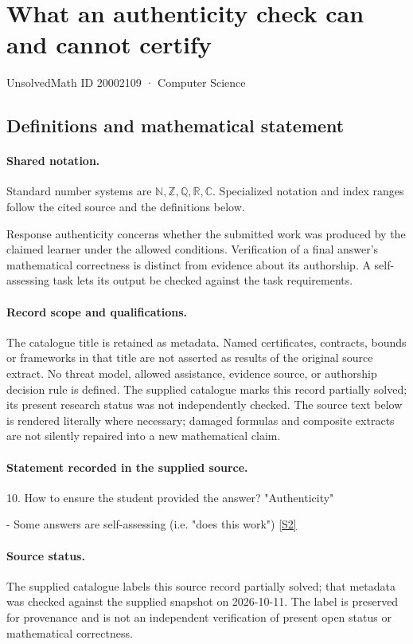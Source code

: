 \documentclass[11pt]{article}
\newcommand{\sref}[2]{\hyperlink{source:#1:#2}{[S#2]}}
\begin{document}
\setcounter{section}{20002108}
\section{What an authenticity check can and cannot certify}\label{20002109}
{\small\sffamily UnsolvedMath ID 20002109 · Computer Science}
\subsection{Definitions and mathematical statement}

\paragraph{Shared notation.}Standard number systems are $\mathbb N,\mathbb Z,\mathbb Q,\mathbb R,\mathbb C$. Specialized notation and index ranges follow the cited source and the definitions below.


Response authenticity concerns whether the submitted work was produced by the claimed learner under the allowed conditions. Verification of a final answer's mathematical correctness is distinct from evidence about its authorship. A self-assessing task lets its output be checked against the task requirements.
\paragraph{Record scope and qualifications.}
The catalogue title is retained as metadata. Named certificates, contracts, bounds or frameworks in that title are not asserted as results of the original source extract.
No threat model, allowed assistance, evidence source, or authorship decision rule is defined. The supplied catalogue marks this record partially solved; its present research status was not independently checked.
The source text below is rendered literally where necessary; damaged formulas and composite extracts are not silently repaired into a new mathematical claim.
\paragraph{Statement recorded in the supplied source.}
10. How to ensure the student provided the answer? "Authenticity"

- Some answers are self-assessing (i.e. "does this work") \sref{20002109}{2}
\paragraph{Source status.}
The supplied catalogue labels this source record partially solved; that metadata was checked against the supplied snapshot on 2026-10-11. The label is preserved for provenance and is not an independent verification of present open status or mathematical correctness.
\end{document}
